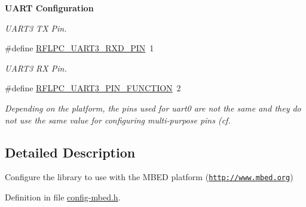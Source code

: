 \begin{Indent}{\bf U\-A\-R\-T Configuration}
\begin{DoxyCompactItemize}
\begin{DoxyCompactList}\small\item\em U\-A\-R\-T3 T\-X Pin. \end{DoxyCompactList}\item 
\hypertarget{group__config_ga447d22f8b082919d45f6b38c10c770a5}{\#define \hyperlink{group__config_ga447d22f8b082919d45f6b38c10c770a5}{R\-F\-L\-P\-C\-\_\-\-U\-A\-R\-T3\-\_\-\-R\-X\-D\-\_\-\-P\-I\-N}~1}\label{group__config_ga447d22f8b082919d45f6b38c10c770a5}

\begin{DoxyCompactList}\small\item\em U\-A\-R\-T3 R\-X Pin. \end{DoxyCompactList}\item 
\#define \hyperlink{group__config_ga96ec09a4733c111eb037839112f7ae3a}{R\-F\-L\-P\-C\-\_\-\-U\-A\-R\-T3\-\_\-\-P\-I\-N\-\_\-\-F\-U\-N\-C\-T\-I\-O\-N}~2
\begin{DoxyCompactList}\small\item\em Depending on the platform, the pins used for uart0 are not the same and they do not use the same value for configuring multi-\/purpose pins (cf. \end{DoxyCompactList}\end{DoxyCompactItemize}
\end{Indent}


\subsection{Detailed Description}
Configure the library to use with the M\-B\-E\-D platform (\href{http://www.mbed.org}{\tt http\-://www.\-mbed.\-org}) 

Definition in file \hyperlink{config-mbed_8h_source}{config-\/mbed.\-h}.

